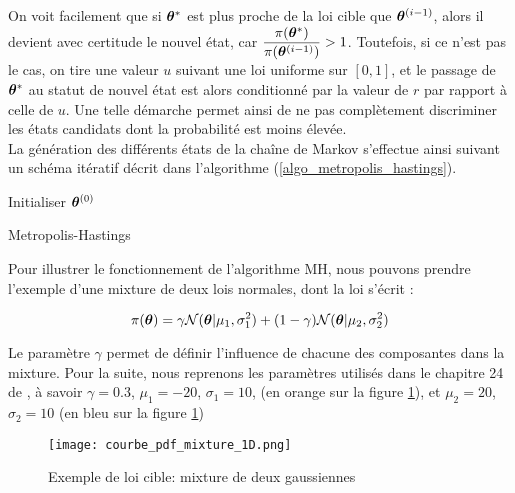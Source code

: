 On voit facilement que si ${{\bm{\theta}}^*}$ est plus proche de la loi cible que ${{\bm{\theta}}^{(i-1)}}$, alors il devient avec certitude le nouvel état, car $\dfrac{\pi({{\bm{\theta}}^*})}{\pi({{\bm{\theta}}^{(i-1)}})} > 1$. Toutefois, si ce n'est pas le cas, on tire une valeur $u$ suivant une loi uniforme sur $[0,1]$, et le passage de ${{\bm{\theta}}^*}$ au statut de nouvel état est alors conditionné par la valeur de $r$ par rapport à celle de $u$. Une telle démarche permet ainsi de ne pas complètement discriminer les états candidats dont la probabilité est moins élevée. \\

La génération des différents états de la chaîne de Markov s'effectue ainsi suivant un schéma itératif décrit dans l'algorithme (\ref{algo_metropolis_hastings}). \\
\IncMargin{1em}
\begin{algorithm}
	\SetAlgoLined
	Initialiser ${\bm{\theta}}^{(0)}$\;
\caption{Metropolis-Hastings}
\label{algo_metropolis_hastings}
\end{algorithm}

Pour illustrer le fonctionnement de l'algorithme MH, nous pouvons prendre l'exemple d'une mixture de deux lois normales, dont la loi s'écrit : 

\begin{equation}
\pi({\bm{\theta}}) = \gamma \mathcal{N}({\bm{\theta}} | \mu_1, \sigma_1^2) + (1-\gamma)\mathcal{N}({\bm{\theta}} | \mu_2, \sigma_2^2)
\label{eq_mixture_2_gaussiennes_1D}
\end{equation}

Le paramètre $\gamma$ permet de définir l'influence de chacune des composantes dans la mixture. Pour la suite, nous reprenons les paramètres utilisés dans le chapitre 24 de  \cite{Murphy2012}, à savoir $\gamma = 0.3$, $\mu_1 = -20$, $\sigma_1 = 10$,  (en orange sur la figure \ref{fig_courbe_pdf_mixture_1D}), et $\mu_2 = 20$, $\sigma_2 = 10$ (en bleu sur la figure \ref{fig_courbe_pdf_mixture_1D})

\begin{figure}[h!]
	\centering
	\texttt{[image: courbe\_pdf\_mixture\_1D.png]}
	\caption{Exemple de loi cible: mixture de deux gaussiennes}
	\label{fig_courbe_pdf_mixture_1D}
\end{figure}


